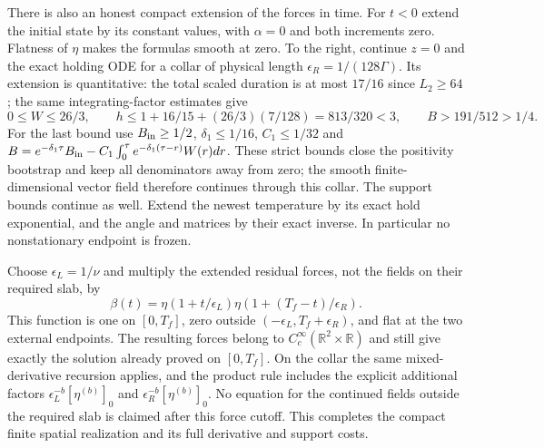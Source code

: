 There is also an honest compact extension of the forces in time.
For $t<0$ extend the initial state by its constant values, with
$\alpha=0$ and both increments zero. Flatness of $\eta$ makes
the formulas smooth at zero. To the right, continue $z=0$ and
the exact holding ODE for a collar of physical length
$\epsilon_R=1/(128\Gamma)$. Its extension is quantitative:
the total scaled duration is at most $17/16$ since $L_2\geq64$;
the same integrating-factor estimates give
\[
 0\leq W\leq26/3,\qquad
 h\leq1+16/15+(26/3)(7/128)=813/320<3,
 \qquad B>191/512>1/4.
\]
For the last bound use $B_{\rm in}\geq1/2$,
$\delta_1\leq1/16$, $C_1\leq1/32$ and
$B=e^{-\delta_1\tau}B_{\rm in}
       -C_1\int_0^\tau e^{-\delta_1(\tau-r)}W(r)dr$.
These strict bounds close the positivity bootstrap and keep all
denominators away from zero; the smooth finite-dimensional vector
field therefore continues through this collar. The support bounds
continue as well. Extend the newest temperature by its exact hold
exponential, and the angle and matrices by their exact inverse.
In particular no nonstationary endpoint is frozen.

Choose $\epsilon_L=1/\nu$ and multiply the extended residual
forces, not the fields on their required slab, by
\[
 \beta(t)=\eta(1+t/\epsilon_L)
                       \eta(1+(T_f-t)/\epsilon_R).
\]
This function is one on $[0,T_f]$, zero outside
$(-\epsilon_L,T_f+\epsilon_R)$, and flat at the two external
endpoints. The resulting forces belong to
$C_c^\infty(\mathbb R^2\times\mathbb R)$ and still give exactly
the solution already proved on $[0,T_f]$. On the collar the same
mixed-derivative recursion applies, and the product rule includes
the explicit additional factors $\epsilon_L^{-b}[\eta^{(b)}]_0$
and $\epsilon_R^{-b}[\eta^{(b)}]_0$. No equation for the
continued fields outside the required slab is claimed after this
force cutoff. This completes the compact finite spatial realization
and its full derivative and support costs.
